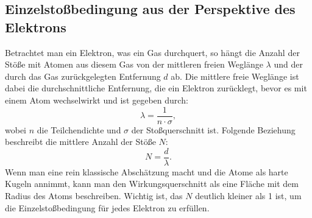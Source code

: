 \subsection{Einzelstoßbedingung aus der Perspektive des Elektrons}
Betrachtet man ein Elektron, was ein Gas durchquert, so hängt die Anzahl der Stöße mit Atomen aus diesem Gas von der mittleren freien Weglänge $\lambda$ und der durch das Gas zurückgelegten Entfernung $d$ ab. Die mittlere freie Weglänge ist dabei die durchschnittliche Entfernung, die ein Elektron zurücklegt, bevor es mit einem Atom wechselwirkt und ist gegeben durch:
\begin{equation}
    \lambda = \frac{1}{n \cdot \sigma},
\end{equation}
wobei $n$ die Teilchendichte und $\sigma$ der Stoßquerschnitt ist.
Folgende Beziehung beschreibt die mittlere Anzahl der Stöße $N$:
\begin{equation}
    N = \frac{d}{\lambda}.
\end{equation}
Wenn man eine rein klassische Abschätzung macht und die Atome als harte Kugeln annimmt, kann man den Wirkungsquerschnitt als eine Fläche mit dem Radius des Atoms beschreiben. Wichtig ist, das $N$ deutlich kleiner als 1 ist, um die Einzelstoßbedingung für jedes Elektron zu erfüllen. 